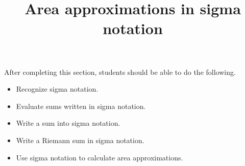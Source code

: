 \documentclass{ximera}
\title{Area approximations in sigma notation}
\begin{document}
\begin{abstract}
\end{abstract}

\maketitle

\begin{sectionOutcomes}

After completing this section, students should be able to do the following.

\begin{itemize}
\item Recognize sigma notation.
\item Evaluate sums written in sigma notation.
\item Write a sum into sigma notation.
\item Write a Riemann sum in sigma notation.
\item Use sigma notation to calculate area approximations.
\end{itemize}



\end{sectionOutcomes}
\end{document}
